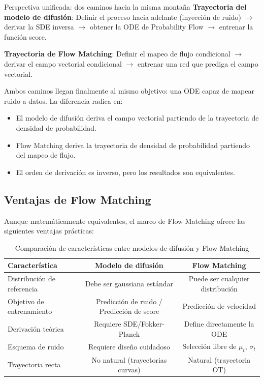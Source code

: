 \documentclass[a4paper]{article}
\begin{document}
\begin{importantbox}{Perspectiva unificada: dos caminos hacia la misma montaña}
\textbf{Trayectoria del modelo de difusión}: Definir el proceso hacia adelante (inyección de ruido) $\to$ derivar la SDE inversa $\to$ obtener la ODE de Probability Flow $\to$ entrenar la función score.

\textbf{Trayectoria de Flow Matching}: Definir el mapeo de flujo condicional $\to$ derivar el campo vectorial condicional $\to$ entrenar una red que prediga el campo vectorial.

Ambos caminos llegan finalmente al mismo objetivo: una ODE capaz de mapear ruido a datos. La diferencia radica en:
\begin{itemize}
    \item El modelo de difusión deriva el campo vectorial partiendo de la trayectoria de densidad de probabilidad.
    \item Flow Matching deriva la trayectoria de densidad de probabilidad partiendo del mapeo de flujo.
    \item El orden de derivación es inverso, pero los resultados son equivalentes.
\end{itemize}
\end{importantbox}

\subsection{Ventajas de Flow Matching}

Aunque matemáticamente equivalentes, el marco de Flow Matching ofrece las siguientes ventajas prácticas:

\begin{table}[H]
\centering
\begin{tabular}{lcc}
\toprule
\textbf{Característica} & \textbf{Modelo de difusión} & \textbf{Flow Matching} \\
\midrule
Distribución de referencia & Debe ser gaussiana estándar & Puede ser cualquier distribución \\
Objetivo de entrenamiento & Predicción de ruido / Predicción de score & Predicción de velocidad \\
Derivación teórica & Requiere SDE/Fokker-Planck & Define directamente la ODE \\
Esquema de ruido & Requiere diseño cuidadoso & Selección libre de $\mu_t$, $\sigma_t$ \\
Trayectoria recta & No natural (trayectorias curvas) & Natural (trayectoria OT) \\
\bottomrule
\end{tabular}
\caption{Comparación de características entre modelos de difusión y Flow Matching}
\end{table}
\end{document}
